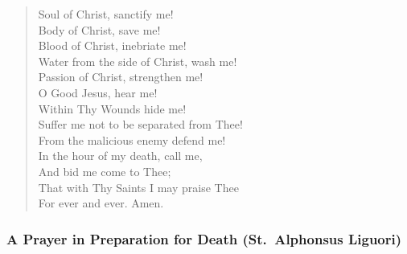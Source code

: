 \begin{quote}
Soul of Christ, sanctify me!\\
Body of Christ, save me!\\
Blood of Christ, inebriate me!\\
Water from the side of Christ, wash me!\\
Passion of Christ, strengthen me!\\
O Good Jesus, hear me!\\
Within Thy Wounds hide me!\\
Suffer me not to be separated from Thee!\\
From the malicious enemy defend me!\\
In the hour of my death, call me,\\
And bid me come to Thee;\\
That with Thy Saints I may praise Thee\\
For ever and ever. Amen.
\end{quote}

\subsubsection*{A Prayer in Preparation for Death (St.\ Alphonsus Liguori)}

